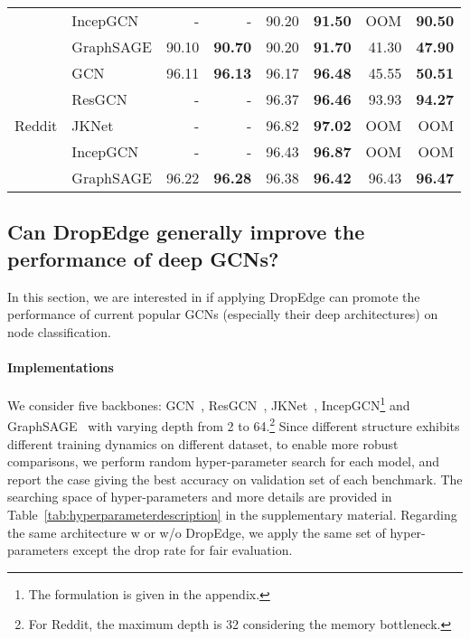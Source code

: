 \documentclass{article}
\begin{document}
\begin{table}[htbp]
\begin{tabular}{rl|rr|rr|rr}
          & IncepGCN & -     & -     & 90.20 & \textbf{91.50} & OOM   & \textbf{90.50} \\
          & GraphSAGE & 90.10 & \textbf{90.70} & 90.20 & \textbf{91.70} & 41.30 & \textbf{47.90} \\
    \hline
    \multicolumn{1}{c}{\multirow{5}[2]{*}{Reddit}} & GCN   & 96.11 & \textbf{96.13} & 96.17 & \textbf{96.48} & 45.55 & \textbf{50.51} \\
          & ResGCN & -     & -     & 96.37 & \textbf{96.46} & 93.93 & \textbf{94.27} \\
          & JKNet & -     & -     & 96.82 & \textbf{97.02} & OOM   & OOM \\
          & IncepGCN & -     & -     & 96.43 & \textbf{96.87} & OOM   & OOM \\
          & GraphSAGE & 96.22 & \textbf{96.28} & 96.38 & \textbf{96.42} & 96.43 & \textbf{96.47} \\
    \hline
    \end{tabular}\label{tab:dropvsnodrop_small}\end{table}


\subsection{Can DropEdge generally improve the performance of deep GCNs?}\label{sec.cmpdropedge}

In this section, we are interested in if applying DropEdge can promote the performance of current popular GCNs (especially their deep architectures) on node classification.




\paragraph{Implementations}
We consider five backbones: GCN~\citep{Kipf2017}, ResGCN~\citep{he2016deep,li2019can}, JKNet~\citep{Xu2018}, IncepGCN\footnote{The formulation is given in the appendix.} and GraphSAGE~\citep{hamilton2017inductive} with varying depth from 2 to 64.\footnote{For Reddit, the maximum depth is 32 considering the memory bottleneck.} Since different structure exhibits different training dynamics on different dataset, to enable more robust comparisons, we perform random  hyper-parameter search for each model, and report the case giving the best accuracy on validation set of each benchmark. The searching space of hyper-parameters and more details are provided in Table~\ref{tab:hyperparameterdescription} in the supplementary material. Regarding the same architecture w or w/o DropEdge, we apply the same set of hyper-parameters except the drop rate  for fair evaluation.
\end{document}
